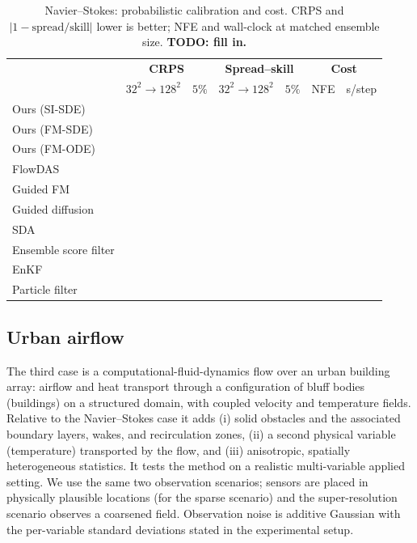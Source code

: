 \begin{table}[ht]
    \centering
    \small
    \caption{Navier--Stokes: probabilistic calibration and cost. CRPS and $|1-\text{spread/skill}|$ lower is better; NFE and wall-clock at matched ensemble size. \textbf{TODO: fill in.}}
    \label{tab:ns_calibration_cost}
    \begin{tabular}{l|cc|cc|cc}
        \toprule
        & \multicolumn{2}{c|}{\textbf{CRPS}}
        & \multicolumn{2}{c|}{\textbf{Spread--skill}}
        & \multicolumn{2}{c}{\textbf{Cost}} \\
        & $32^2\!\to\!128^2$ & $5\%$ & $32^2\!\to\!128^2$ & $5\%$ & NFE & s/step \\
        \midrule
        Ours (SI-SDE) & & & & & & \\
        Ours (FM-SDE) & & & & & & \\
        Ours (FM-ODE) & & & & & & \\
        \midrule
        FlowDAS \cite{chen_flowdas_2025} & & & & & & \\
        Guided FM \cite{yan_fig_2024} & & & & & & \\
        Guided diffusion \cite{chung_diffusion_2023} & & & & & & \\
        SDA \cite{rozet_score-based_2023} & & & & & & \\
        Ensemble score filter \cite{bao_ensemble_2024} & & & & & & \\
        EnKF \cite{evensen_data_2022} & & & & & & \\
        Particle filter \cite{carrassi_data_2018} & & & & & & \\
        \bottomrule
    \end{tabular}
\end{table}

\subsection{Urban airflow}
\label{subsec:results_urban}
The third case is a computational-fluid-dynamics flow over an urban building array: airflow and heat transport through a configuration of bluff bodies (buildings) on a structured domain, with coupled velocity and temperature fields. Relative to the Navier--Stokes case it adds (i) solid obstacles and the associated boundary layers, wakes, and recirculation zones, (ii) a second physical variable (temperature) transported by the flow, and (iii) anisotropic, spatially heterogeneous statistics. It tests the method on a realistic multi-variable applied setting. We use the same two observation scenarios; sensors are placed in physically plausible locations (for the sparse scenario) and the super-resolution scenario observes a coarsened field. Observation noise is additive Gaussian with the per-variable standard deviations stated in the experimental setup.

